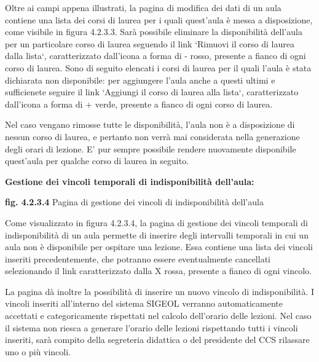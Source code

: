 \documentclass[11pt,a4paper]{article}
\begin{document}
Oltre ai campi appena illustrati, la pagina di modifica dei dati di un aula contiene una lista dei corsi di laurea per i quali quest'aula è messa a disposizione, come visibile in figura 4.2.3.3.
Sarà possibile eliminare la disponibilità dell'aula per un particolare corso di laurea seguendo il link `Rimuovi il corso di laurea dalla lista`, caratterizzato dall'icona a forma di - rosso, presente a fianco di ogni corso di laurea.
Sono di seguito elencati i corsi di laurea per il quali l'aula è stata dichiarata non disponibile: per aggiungere l'aula anche a questi ultimi e sufficienete seguire il link `Aggiungi il corso di laurea alla lista`, caratterizzato dall'icona a forma di + verde, presente a fianco di ogni corso di laurea.

Nel caso vengano rimosse tutte le disponibilità, l'aula non è a disposizione di nessun corso di laurea, e pertanto non verrà mai considerata nella generazione degli orari di lezione.
E' pur sempre possibile rendere nuovamente disponibile quest'aula per qualche corso di laurea in seguito.
\newline \newline
\begin{large}\textbf{Gestione dei vincoli temporali di indisponibilità dell'aula:}\end{large}

\bigskip
\begin{center}
	\textbf{fig. 4.2.3.4} Pagina di gestione dei vincoli di indisponibilità dell'aula\\
\end{center}
\bigskip

Come visualizzato in figura 4.2.3.4, la pagina di gestione dei vincoli temporali di indisponibilità di un aula permette di inserire degli intervalli temporali in cui un aula non è disponibile per ospitare una lezione.
Essa contiene una lista dei vincoli inseriti precedentemente, che potranno essere eventualmente cancellati selezionando il link caratterizzato dalla X rossa, presente a fianco di ogni vincolo.

La pagina dà inoltre la possibilità di inserire un nuovo vincolo di indisponibilità.
I vincoli inseriti all'interno del sistema SIGEOL verranno automaticamente accettati e categoricamente rispettati nel calcolo dell'orario delle lezioni.
Nel caso il sistema non riesca a generare l'orario delle lezioni rispettando tutti i vincoli inseriti, sarà compito della segreteria didattica o del presidente del CCS rilassare uno o più vincoli.
\end{document}
